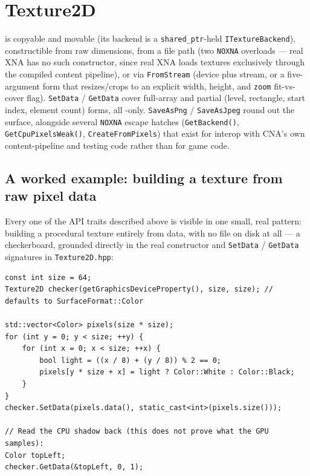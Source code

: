 \section{Texture2D}

 is copyable and movable (its backend is a \texttt{shared\_ptr}-held
\texttt{ITextureBackend}), constructible from raw dimensions, from a file path (two
\texttt{NOXNA} overloads --- real XNA has no such constructor, since real XNA loads textures
exclusively through the compiled content pipeline), or via \texttt{FromStream} (device plus
stream, or a five-argument form that resizes/crops to an explicit width, height, and
\texttt{zoom} fit-vs-cover flag). \texttt{SetData} / \texttt{GetData} cover full-array and
partial (level, rectangle, start index, element count) forms, all -only.
\texttt{SaveAsPng} / \texttt{SaveAsJpeg} round out the surface, alongside several
\texttt{NOXNA} escape hatches (\texttt{GetBackend()}, \texttt{GetCpuPixelsWeak()},
\texttt{CreateFromPixels}) that exist for interop with CNA's own content-pipeline and testing
code rather than for game code.

\subsection{A worked example: building a texture from raw pixel data}

Every one of the API traits described above is visible in one small, real pattern: building a
procedural texture entirely from  data, with no file on disk at all --- a
checkerboard, grounded directly in the real constructor and \texttt{SetData} / \texttt{GetData}
signatures in \texttt{Texture2D.hpp}:

\begin{lstlisting}
const int size = 64;
Texture2D checker(getGraphicsDeviceProperty(), size, size); // defaults to SurfaceFormat::Color

std::vector<Color> pixels(size * size);
for (int y = 0; y < size; ++y) {
    for (int x = 0; x < size; ++x) {
        bool light = ((x / 8) + (y / 8)) % 2 == 0;
        pixels[y * size + x] = light ? Color::White : Color::Black;
    }
}
checker.SetData(pixels.data(), static_cast<int>(pixels.size()));

// Read the CPU shadow back (this does not prove what the GPU samples):
Color topLeft;
checker.GetData(&topLeft, 0, 1);
\end{lstlisting}

